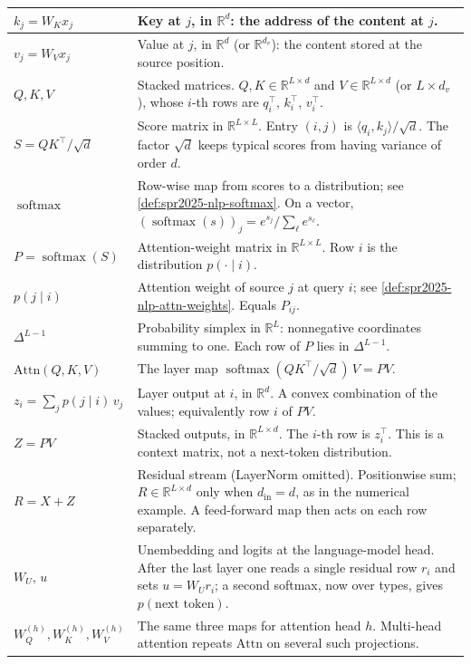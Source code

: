 \documentclass[11pt,a4paper]{article}
\DeclareMathOperator{\softmax}{softmax}
\theoremstyle{definition}
\begin{document}
{\begin{center}
\begin{tabularx}{\linewidth}{|
  >{\raggedright\arraybackslash}p{3.05cm}|
  >{\raggedright\arraybackslash}X|
}
\hline
\(k_j=W_K x_j\) & Key at \(j\), in \(\mathbb{R}^d\): the address of the content at \(j\). \\
\hline
\(v_j=W_V x_j\) & Value at \(j\), in \(\mathbb{R}^d\) (or \(\mathbb{R}^{d_v}\)): the content stored at the source position. \\
\hline
\(Q,K,V\) & Stacked matrices. \(Q,K\in\mathbb{R}^{L\times d}\) and \(V\in\mathbb{R}^{L\times d}\) (or \(L\times d_v\)), whose \(i\)-th rows are \(q_i^\top\), \(k_i^\top\), \(v_i^\top\). \\
\hline
\(S=QK^\top/\sqrt{d}\) & Score matrix in \(\mathbb{R}^{L\times L}\). Entry \((i,j)\) is \(\langle q_i,k_j\rangle/\sqrt{d}\). The factor \(\sqrt{d}\) keeps typical scores from having variance of order \(d\). \\
\hline
\(\softmax\) & Row-wise map from scores to a distribution; see \cref{def:spr2025-nlp-softmax}. On a vector, \((\softmax(s))_j=e^{s_j}/\sum_\ell e^{s_\ell}\). \\
\hline
\(P=\softmax(S)\) & Attention-weight matrix in \(\mathbb{R}^{L\times L}\). Row \(i\) is the distribution \(p(\cdot\mid i)\). \\
\hline
\(p(j\mid i)\) & Attention weight of source \(j\) at query \(i\); see \cref{def:spr2025-nlp-attn-weights}. Equals \(P_{ij}\). \\
\hline
\(\Delta^{L-1}\) & Probability simplex in \(\mathbb{R}^L\): nonnegative coordinates summing to one. Each row of \(P\) lies in \(\Delta^{L-1}\). \\
\hline
\(\mathrm{Attn}(Q,K,V)\) & The layer map \(\softmax(QK^\top/\sqrt{d})\,V=PV\). \\
\hline
\(z_i=\sum_j p(j\mid i)\,v_j\) & Layer output at \(i\), in \(\mathbb{R}^d\). A convex combination of the values; equivalently row \(i\) of \(PV\). \\
\hline
\(Z=PV\) & Stacked outputs, in \(\mathbb{R}^{L\times d}\). The \(i\)-th row is \(z_i^\top\). This is a context matrix, not a next-token distribution. \\
\hline
\(R=X+Z\) & Residual stream (LayerNorm omitted). Positionwise sum; \(R\in\mathbb{R}^{L\times d}\) only when \(d_{\mathrm{in}}=d\), as in the numerical example. A feed-forward map then acts on each row separately. \\
\hline
\(W_U\), \(u\) & Unembedding and logits at the language-model head. After the last layer one reads a single residual row \(r_i\) and sets \(u=W_U r_i\); a second softmax, now over types, gives \(p(\text{next token})\). \\
\hline
\(W_Q^{(h)},W_K^{(h)},W_V^{(h)}\) & The same three maps for attention head \(h\). Multi-head attention repeats \(\mathrm{Attn}\) on several such projections. \\
\hline
\end{tabularx}
\end{center}
}
\end{document}
